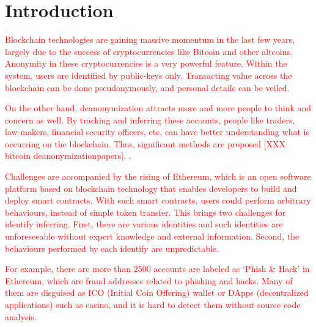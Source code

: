 \section{Introduction}
\textcolor{red}{
Blockchain technologies are gaining massive momentum in the last few years, largely due to the success of cryptocurrencies like Bitcoin and other altcoins. Anonymity in these cryptocurrencies is a very powerful feature. Within the system, users are identified by public-keys only. Transacting value across the blockchain can be done pseudonymously, and personal details can be veiled.
}

\textcolor{red}{
On the other hand, deanonymization attracts more and more people to think and concern as well. By tracking and inferring these accounts, people like traders, law-makers, financial security officers, etc, can have better understanding what is occurring on the blockchain. Thus, significant methods are proposed [XXX bitcoin deanonymizationpapers]. 
}.

\textcolor{red}{
Challenges are accompanied by the rising of Ethereum, which is an open software platform based on blockchain technology that enables developers to build and deploy smart contracts.
With such smart contracts, users could perform arbitrary behaviours, instead of simple token transfer. This brings two challenges for identify inferring. First, there are various identities and such identities are unforeseeable without expert knowledge and external information. Second, the behaviours performed by each identify are unpredictable.
}

\textcolor{red}{
For example, there are more than $2500$ accounts are labeled as `Phish \& Hack' in Ethereum, which are fraud addresses related to phishing and hacks. Many of them are disguised as ICO (Initial Coin Offering) wallet or DApps (decentralized applications) such as casino, and it is hard to detect them without source code analysis. 
}

